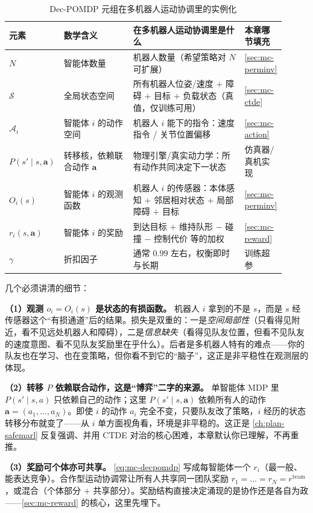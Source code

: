 \begin{table}[H]\centering\small
\caption{Dec-POMDP 元组在多机器人运动协调里的实例化}
\label{tab:mc-decpomdp}
\begin{tabular}{p{0.10\linewidth}p{0.26\linewidth}p{0.42\linewidth}p{0.13\linewidth}}
\toprule
元素 & 数学含义 & 在多机器人运动协调里是什么 & 本章哪节填充 \\
\midrule
$N$ & 智能体数量 & 机器人数量（希望策略对 $N$ 可扩展） & \cref{sec:mc-perminv} \\
$\mathcal{S}$ & 全局状态空间 & 所有机器人位姿/速度 $+$ 障碍 $+$ 目标 $+$ 负载状态（真值，仅训练可用） & \cref{sec:mc-ctde} \\
$\mathcal{A}_i$ & 智能体 $i$ 的动作空间 & 机器人 $i$ 能下的指令：速度指令 / 关节位置偏移 & \cref{sec:mc-action} \\
$P(s'\mid s,\mathbf{a})$ & 转移核，依赖联合动作 $\mathbf{a}$ & 物理引擎/真实动力学：所有动作共同决定下一状态 & 仿真器/真机实现 \\
$O_i(s)$ & 智能体 $i$ 的观测函数 & 机器人 $i$ 的传感器：本体感知 $+$ 邻居相对状态 $+$ 局部障碍 $+$ 目标 & \cref{sec:mc-perminv} \\
$r_i(s,\mathbf{a})$ & 智能体 $i$ 的奖励 & 到达目标 $+$ 维持队形 $-$ 碰撞 $-$ 控制代价 等的加权 & \cref{sec:mc-reward} \\
$\gamma$ & 折扣因子 & 通常 $0.99$ 左右，权衡即时与长期 & 训练超参 \\
\bottomrule
\end{tabular}
\end{table}

\noindent 几个必须讲清的细节：

\textbf{（1）观测 $o_i=O_i(s)$ 是状态的有损函数。} 机器人 $i$ 拿到的不是 $s$，而是 $s$ 经传感器这个“有损通道”后的结果。损失是双重的：一是\emph{空间局部性}（只看得见附近，看不见远处机器人和障碍），二是\emph{信息缺失}（看得见队友位置，但看不见队友的速度意图、看不见队友奖励里在乎什么）。后者是多机器人特有的难点——你的队友也在学习、也在变策略，但你看不到它的“脑子”，这正是非平稳性在观测层的体现。

\textbf{（2）转移 $P$ 依赖联合动作，这是“博弈”二字的来源。} 单智能体 MDP 里 $P(s'\mid s,a)$ 只依赖自己的动作；这里 $P(s'\mid s,\mathbf{a})$ 依赖所有人的动作 $\mathbf{a}=(a_1,\dots,a_N)$。即使 $i$ 的动作 $a_i$ 完全不变，只要队友改了策略，$i$ 经历的状态转移分布就变了——从 $i$ 单方面视角看，环境是非平稳的。这正是 \cref{ch:plan-safemarl} 反复强调、并用 CTDE 对治的核心困难，本章默认你已理解，不再重推。

\textbf{（3）奖励可个体亦可共享。} \cref{eq:mc-decpomdp} 写成每智能体一个 $r_i$（最一般、能表达竞争）。合作型运动协调常让所有人共享同一团队奖励 $r_1=\dots=r_N=r^{\text{team}}$，或混合（个体部分 $+$ 共享部分）。奖励结构直接决定涌现的是协作还是各自为政——\cref{sec:mc-reward} 的核心，这里先埋下。

